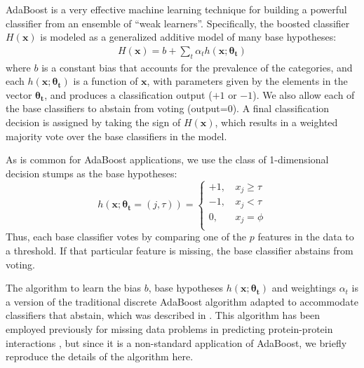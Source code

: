 \documentclass[
   technote
]{phildoc}
\begin{document}
AdaBoost \cite{Schapire:1999} is a very effective machine learning technique for building a powerful classifier from an ensemble of ``weak learners''.  Specifically, the boosted classifier $H(\bm{x})$ is modeled as a generalized additive model of many base hypotheses:
\begin{eqnarray}
H(\bm{x}) = b + \sum_{t} \alpha_t h(\bm{x}; \bm{\theta_t})
\label{eqn:additive}
\end{eqnarray}
where $b$ is a constant bias that accounts for the prevalence of the categories, and each $h(\bm{x};\bm{\theta_t})$ is a function of $\bm{x}$, with parameters given by the elements in the vector $\bm{\theta_t}$, and produces a classification output ($+1$ or $-1$).  We also allow each of the base classifiers to abstain from voting (output=$0$).  A final classification decision is assigned by taking the sign of $H(\bm{x})$, which results in a weighted majority vote over the base classifiers in the model.

As is common for AdaBoost applications, we use the class of 1-dimensional decision stumps as the base hypotheses:
\begin{equation}
h(\bm{x}; \bm{\theta_t}=(j,\tau)) = \left\{\begin{array}{rl} +1\text{, } & x_j \geq \tau \\ -1\text{, } & x_j < \tau \\ 0\text{, } & x_j = \phi \\ \end{array}\right.
\end{equation}
Thus, each base classifier votes by comparing one of the $p$ features in the data to a threshold.  If that particular feature is missing, the base classifier abstains from voting.

The algorithm to learn the bias $b$, base hypotheses $h(\bm{x};\bm{\theta_t})$ and weightings $\alpha_t$ is a version of the traditional discrete AdaBoost algorithm adapted to accommodate classifiers that abstain, which was described in \cite{Schapire:1999}. This algorithm has been employed previously for missing data problems in predicting protein-protein interactions \cite{Smeraldi:2010}, but since it is a non-standard application of AdaBoost, we briefly reproduce the details of the algorithm here.
\end{document}
